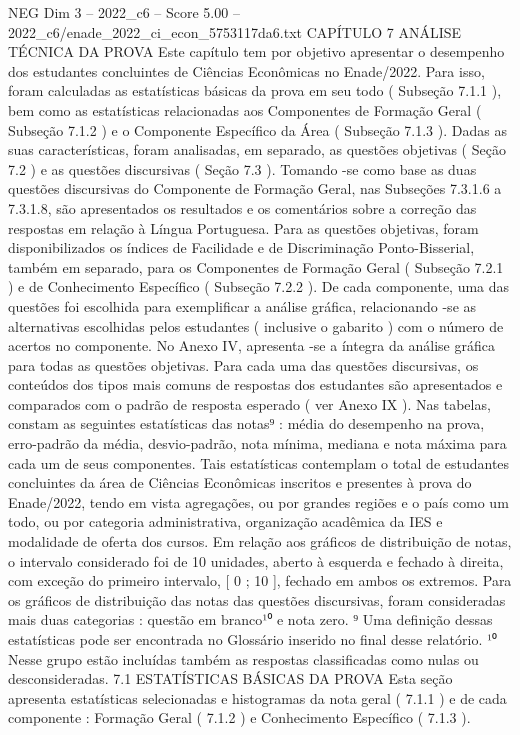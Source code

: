 \begin{textsample}{NEG Dim 3 – 2022\_c6 – Score 5.00 – 2022\_c6/enade\_2022\_ci\_econ\_5753117da6.txt}  \label{ex:f3_neg_260}
CAPÍTULO 7 ANÁLISE TÉCNICA DA PROVA Este capítulo tem por objetivo apresentar o desempenho dos estudantes concluintes de Ciências Econômicas no Enade/2022.
Para isso, foram calculadas as estatísticas básicas da prova em seu todo ( Subseção 7.1.1 ), bem como as estatísticas relacionadas aos Componentes de Formação Geral ( Subseção 7.1.2 ) e o Componente Específico da Área ( Subseção 7.1.3 ).
Dadas as suas características, foram analisadas, em separado, as questões objetivas ( Seção 7.2 ) e as questões discursivas ( Seção 7.3 ).
Tomando -se como base as duas questões discursivas do Componente de Formação Geral, nas Subseções 7.3.1.6 a 7.3.1.8, são apresentados os resultados e os comentários sobre a correção das respostas em relação à Língua Portuguesa.
Para as questões objetivas, foram disponibilizados os índices de Facilidade e de Discriminação Ponto-Bisserial, também em separado, para os Componentes de Formação Geral ( Subseção 7.2.1 ) e de Conhecimento Específico ( Subseção 7.2.2 ).
De cada componente, uma das questões foi escolhida para exemplificar a análise gráfica, relacionando -se as alternativas escolhidas pelos estudantes ( inclusive o gabarito ) com o número de acertos no componente.
No Anexo IV, apresenta -se a íntegra da análise gráfica para todas as questões objetivas.
Para cada uma das questões discursivas, os conteúdos dos tipos mais comuns de respostas dos estudantes são apresentados e comparados com o padrão de resposta esperado ( ver Anexo IX ).
Nas tabelas, constam as seguintes estatísticas das notas⁹ : média do desempenho na prova, erro-padrão da média, desvio-padrão, nota mínima, mediana e nota máxima para cada um de seus componentes.
Tais estatísticas contemplam o total de estudantes concluintes da área de Ciências Econômicas inscritos e presentes à prova do Enade/2022, tendo em vista agregações, ou por grandes regiões e o país como um todo, ou por categoria administrativa, organização acadêmica da IES e modalidade de oferta dos cursos.
Em relação aos gráficos de distribuição de notas, o intervalo considerado foi de 10 unidades, aberto à esquerda e fechado à direita, com exceção do primeiro intervalo, [ 0 ; 10 ], fechado em ambos os extremos.
Para os gráficos de distribuição das notas das questões discursivas, foram consideradas mais duas categorias : questão em branco¹⁰ e nota zero. ⁹ Uma definição dessas estatísticas pode ser encontrada no Glossário inserido no final desse relatório. ¹⁰ Nesse grupo estão incluídas também as respostas classificadas como nulas ou desconsideradas. 7.1 ESTATÍSTICAS BÁSICAS DA PROVA Esta seção apresenta estatísticas selecionadas e histogramas da nota geral ( 7.1.1 ) e de cada componente : Formação Geral ( 7.1.2 ) e Conhecimento Específico ( 7.1.3 ).

\end{textsample}
